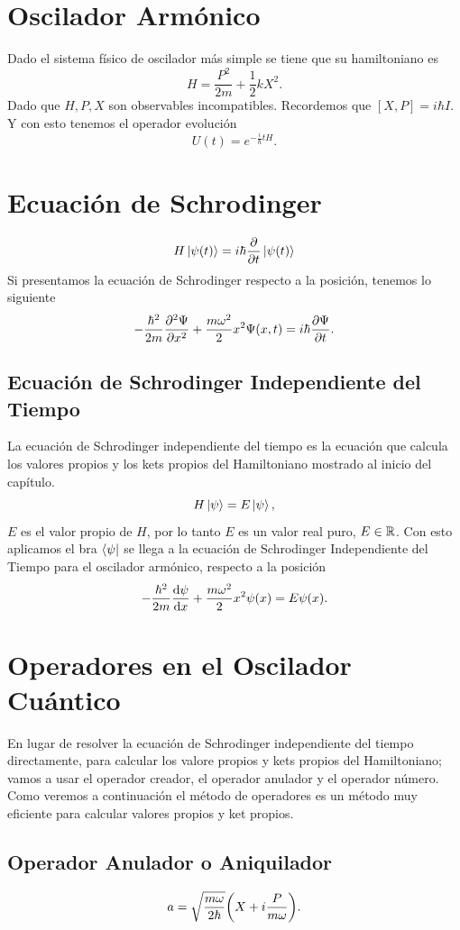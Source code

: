 \section{Oscilador Armónico}
Dado el sistema físico de oscilador más simple se tiene que su hamiltoniano es
	$$ H = \frac{P^2}{2m} + \frac{1}{2} kX^2. $$
Dado que $H,P,X$ son observables incompatibles. Recordemos que $[X,P] = i\hbar I$. Y con esto tenemos el operador evolución
	$$ U(t) = e^{-\frac{i}{\hbar} tH}. $$


\section{Ecuación de Schrodinger}
	$$ H\ket{\psi (t)} = i\hbar \pdv{t} \ket{\psi (t)} $$
Si presentamos la ecuación de Schrodinger respecto a la posición, tenemos lo siguiente
	$$ -\frac{\hbar ^2}{2m} \pdv[2]{\Psi}{x} + \frac{m\omega ^2}{2} x^2 \Psi (x,t) = i\hbar \pdv{\Psi}{t}. $$

\subsection{Ecuación de Schrodinger Independiente del Tiempo}
La ecuación de Schrodinger independiente del tiempo es la ecuación que calcula los valores propios y los kets propios del Hamiltoniano mostrado al inicio del capítulo.
	$$ H\ket{\psi} = E\ket{\psi}, $$
$E$ es el valor propio de $H$, por lo tanto $E$ es un valor real puro, $E\in \mathbb{R}$.  Con esto aplicamos el bra $\bra{\psi}$ se llega a la ecuación de Schrodinger Independiente del Tiempo para el oscilador armónico, respecto a la posición
	$$ -\frac{\hbar ^2}{2m} \dv{\psi}{x} + \frac{m\omega ^2}{2} x^2 \psi (x) = E\psi (x). $$


\section{Operadores en el Oscilador Cuántico}
En lugar de resolver la ecuación de Schrodinger independiente del tiempo directamente, para calcular los valore propios y kets propios del Hamiltoniano; vamos a usar el operador creador, el operador anulador y el operador número. Como veremos a continuación el método de operadores es un método muy eficiente para calcular valores propios y ket propios.

\subsection{Operador Anulador o Aniquilador}
	$$ a = \sqrt{\frac{m\omega}{2\hbar}} \qty(X + i\frac{P}{m\omega}). $$


